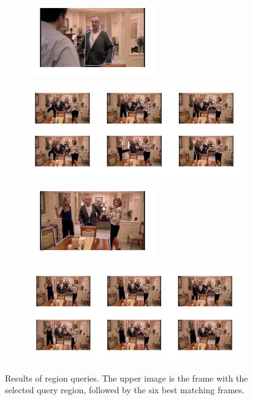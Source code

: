 \documentclass{paper}
\begin{document}
\begin{figure}[h!]
    \centering
    \begin{subfigure}[]{\textwidth}
        \centering
        \includegraphics[width=0.6\textwidth]{regionQuery1sel.png}
    \end{subfigure}
    \begin{subfigure}[]{\textwidth}
        \centering
        \includegraphics[width=\textwidth]{regionQuery1res.png}
    \end{subfigure}
    \begin{subfigure}[]{\textwidth}
        \centering
        \includegraphics[width=0.6\textwidth]{regionQuery2sel.png}
    \end{subfigure}
    \begin{subfigure}[]{\textwidth}
        \centering
        \includegraphics[width=\textwidth]{regionQuery2res.png}
    \end{subfigure}
    \caption{Results of region queries. The upper image is the frame with the selected query region, followed by the six best matching frames. }
\label{fig:regMatch1}
\end{figure}
\end{document}
